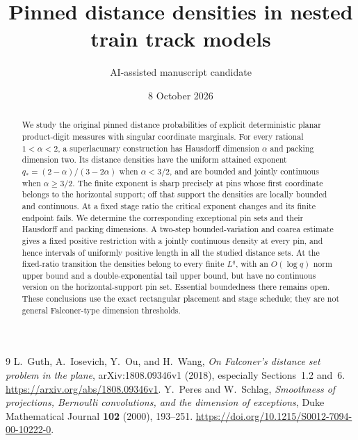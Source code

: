 \documentclass[11pt]{article}
\title{Pinned distance densities in nested train track models}
\author{AI-assisted manuscript candidate}
\date{8 October 2026}
\numberwithin{equation}{section}
\theoremstyle{definition}\newtheorem{definition}[theorem]{Definition}
\theoremstyle{remark}\newtheorem{remark}[theorem]{Remark}
\begin{document}
\maketitle
\begin{abstract}
We study the original pinned distance probabilities of explicit deterministic
planar product-digit measures with singular coordinate marginals. For every
rational $1<\alpha<2$, a superlacunary construction has Hausdorff dimension
$\alpha$ and packing dimension two. Its distance densities have the uniform
attained exponent $q_*=(2-\alpha)/(3-2\alpha)$ when $\alpha<3/2$, and are
bounded and jointly continuous when $\alpha\geq3/2$. The finite exponent is
sharp precisely at pins whose first coordinate belongs to the horizontal
support; off that support the densities are locally bounded and continuous.
At a fixed stage ratio the critical exponent changes and its finite endpoint
fails. We determine the corresponding exceptional pin sets and their
Hausdorff and packing dimensions. A two-step bounded-variation and coarea
estimate gives a fixed positive restriction with a jointly continuous density
at every pin, and hence intervals of uniformly positive length in all the
studied distance sets. At the fixed-ratio transition the densities belong to
every finite $L^q$, with an $O(\log q)$ norm upper bound and a
double-exponential tail upper bound, but have no continuous version on the
horizontal-support pin set. Essential boundedness there remains open.
These conclusions use the exact rectangular placement and stage schedule;
they are not general Falconer-type dimension thresholds.
\end{abstract}
\setcounter{tocdepth}{1}
\tableofcontents









\appendix

\begin{thebibliography}{9}
L.~Guth, A.~Iosevich, Y.~Ou, and H.~Wang,
\emph{On Falconer's distance set problem in the plane},
arXiv:1808.09346v1 (2018), especially Sections~1.2 and~6.
\url{https://arxiv.org/abs/1808.09346v1}.
Y.~Peres and W.~Schlag,
\emph{Smoothness of projections, Bernoulli convolutions, and the dimension
of exceptions}, Duke Mathematical Journal \textbf{102} (2000), 193--251.
\url{https://doi.org/10.1215/S0012-7094-00-10222-0}.
\end{thebibliography}
\end{document}
